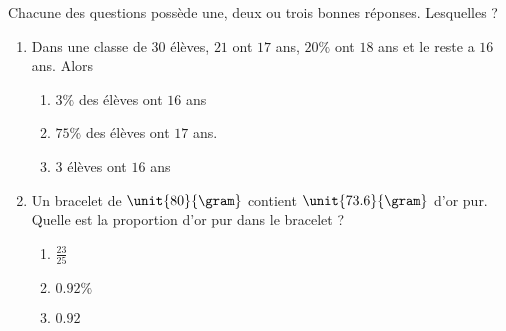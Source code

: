 
\begin{exercice}\label{exoPremiere-0014}

    Chacune des questions possède une, deux ou trois bonnes réponses. Lesquelles ?
    \begin{multicols}{3}
    \begin{enumerate}
        \item
        Dans une classe de \( 30\) élèves, \( 21\) ont \( 17\) ans, \( 20\%\) ont \( 18\) ans et le reste a \( 16\) ans.  Alors
        \begin{enumerate}
            \item

         \( 3\%\) des élèves ont \( 16\) ans
     \item
         \( 75\%\) des élèves ont \( 17\) ans.
     \item
         \( 3\) élèves ont \( 16\) ans
                
        \end{enumerate}
    \item
        Un bracelet de \( \unit{80}{\gram}\) contient \( \unit{73.6}{\gram}\) d'or pur. Quelle est la proportion d'or pur dans le bracelet ?
        \begin{enumerate}
            \item
        \( \frac{ 23 }{ 25 }\)
    \item
        \( 0.92\%\)
    \item
        \( 0.92\)

        \end{enumerate}


\end{enumerate}
\end{multicols}
\end{exercice}
